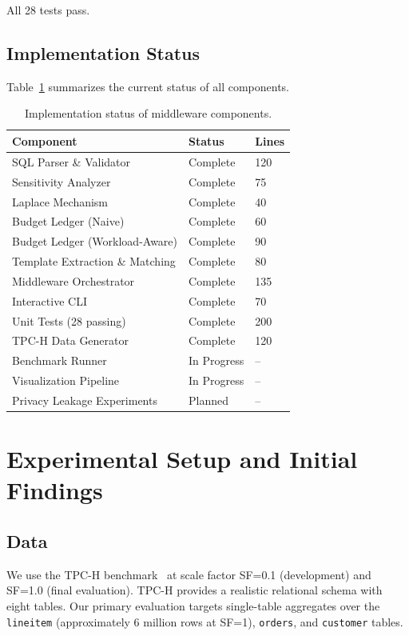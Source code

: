 \documentclass[sigconf,nonacm]{acmart}
\begin{document}
All 28 tests pass.

\subsection{Implementation Status}

Table~\ref{tab:status} summarizes the current status of all components.

\begin{table}[h]
\caption{Implementation status of middleware components.}
\label{tab:status}
\begin{tabular}{lll}
\toprule
Component & Status & Lines \\
\midrule
SQL Parser \& Validator & Complete & 120 \\
Sensitivity Analyzer & Complete & 75 \\
Laplace Mechanism & Complete & 40 \\
Budget Ledger (Naive) & Complete & 60 \\
Budget Ledger (Workload-Aware) & Complete & 90 \\
Template Extraction \& Matching & Complete & 80 \\
Middleware Orchestrator & Complete & 135 \\
Interactive CLI & Complete & 70 \\
Unit Tests (28 passing) & Complete & 200 \\
TPC-H Data Generator & Complete & 120 \\
\midrule
Benchmark Runner & In Progress & -- \\
Visualization Pipeline & In Progress & -- \\
Privacy Leakage Experiments & Planned & -- \\
\bottomrule
\end{tabular}
\end{table}

\section{Experimental Setup and Initial Findings}
\label{sec:experiments}

\subsection{Data}

We use the TPC-H benchmark~\cite{tpch} at scale factor SF=0.1 (development) and SF=1.0 (final evaluation). TPC-H provides a realistic relational schema with eight tables. Our primary evaluation targets single-table aggregates over the \texttt{lineitem} (approximately 6 million rows at SF=1), \texttt{orders}, and \texttt{customer} tables.
\end{document}
